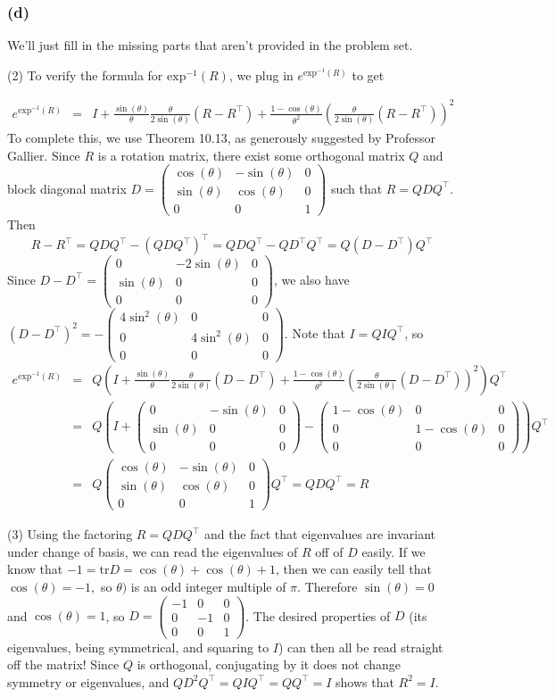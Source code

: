 \documentclass{article}
\newcommand{\trace}{\textrm{tr}}
\newcommand{\threematrix}[9]{\left(\begin{array}{ccc} #1 & #2 & #3\\ #4 & #5 & #6 \\ #7 & #8 & #9 \end{array}\right)}
\begin{document}
\subsubsection{(d)}
We'll just fill in the missing parts that aren't provided in the problem set.

\noindent (2)
To verify the formula for $\text{exp}^{-1}(R)$, we plug in $e^{\text{exp}^{-1}(R)}$ to get

\begin{eqnarray*}
e^{\text{exp}^{-1}(R)}&=& 
I + \frac{\sin(\theta)}{\theta} \frac{\theta}{2\sin(\theta)}(R - R^\top)
+ \frac{1-\cos(\theta)}{\theta^2} \left( \frac{\theta}{2\sin(\theta)}(R - R^\top) \right)^2
\end{eqnarray*}
To complete this, we use Theorem 10.13, as generously suggested by Professor Gallier.
Since $R$ is a rotation matrix, there exist some orthogonal matrix $Q$ and block diagonal matrix $D = \threematrix{\cos(\theta)}{-\sin(\theta)}{0}{\sin(\theta)}{\cos(\theta)}{0}{0}{0}{1}$ such that $R = QDQ^\top$.
Then \[R - R^\top = QDQ^\top - (QDQ^\top)^\top = QDQ^\top - QD^\top Q^\top
                  = Q(D - D^\top)Q^\top\]
Since $D - D^\top = \threematrix{0}{-2\sin(\theta)}{0}{\sin(\theta)}{0}{0}{0}{0}{0}$,
we also have $(D - D^\top)^2 = -\threematrix{4\sin^2(\theta)}{0}{0}{0}{4\sin^2(\theta)}{0}{0}{0}{0}$.
Note that $I = QIQ^\top$, so
\begin{eqnarray*}
e^{\text{exp}^{-1}(R)}&=& Q\left(
I + \frac{\sin(\theta)}{\theta} \frac{\theta}{2\sin(\theta)}(D - D^\top)
+ \frac{1-\cos(\theta)}{\theta^2} \left( \frac{\theta}{2\sin(\theta)}(D - D^\top) \right)^2\right)Q^\top\\
&=& Q\left(I + \threematrix{0}{-\sin(\theta)}{0}{\sin(\theta)}{0}{0}{0}{0}{0}
- \threematrix{1 - \cos(\theta)}{0}{0}{0}{1-\cos(\theta)}{0}{0}{0}{0}\right)Q^\top\\
&=& Q\threematrix{\cos(\theta)}{-\sin(\theta)}{0}{\sin(\theta)}{\cos(\theta)}{0}{0}{0}{1} Q^\top
 = QDQ^\top = R
\end{eqnarray*}

\noindent (3)
Using the factoring $R = QDQ^\top$ and the fact that eigenvalues are invariant under change of basis, we can read the eigenvalues of $R$ off of $D$ easily.
If we know that $-1 = \trace{D} = \cos(\theta) + \cos(\theta) + 1$, then we can easily tell that $\cos(\theta) = -1,$ so $\theta)$ is an odd integer multiple of $\pi$.
Therefore $\sin(\theta) = 0$ and $\cos(\theta) = 1$, so $D = \threematrix{-1}{0}{0}{0}{-1}{0}{0}{0}{1}$.
The desired properties of $D$ (its eigenvalues, being symmetrical, and squaring to $I$) can then all be read straight off the matrix!
Since $Q$ is orthogonal, conjugating by it does not change symmetry or eigenvalues, and $QD^2Q^\top = QIQ^\top = QQ^\top = I$ shows that $R^2 = I$.
\end{document}
